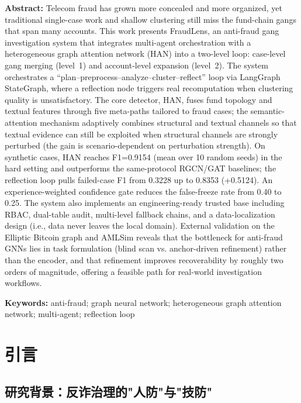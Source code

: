 \documentclass[12pt,a4paper]{ctexart}
\begin{document}
\noindent\textbf{Abstract:} Telecom fraud has grown more concealed and more organized, yet traditional single-case work and shallow clustering still miss the fund-chain gangs that span many accounts. This work presents FraudLens, an anti-fraud gang investigation system that integrates multi-agent orchestration with a heterogeneous graph attention network (HAN) into a two-level loop: case-level gang merging (level~1) and account-level expansion (level~2). The system orchestrates a ``plan--preprocess--analyze--cluster--reflect'' loop via LangGraph StateGraph, where a reflection node triggers real recomputation when clustering quality is unsatisfactory. The core detector, HAN, fuses fund topology and textual features through five meta-paths tailored to fraud cases; the semantic-attention mechanism adaptively combines structural and textual channels so that textual evidence can still be exploited when structural channels are strongly perturbed (the gain is scenario-dependent on perturbation strength). On synthetic cases, HAN reaches F1=0.9154 (mean over 10 random seeds) in the hard setting and outperforms the same-protocol RGCN/GAT baselines; the reflection loop pulls failed-case F1 from 0.3228 up to 0.8353 (+0.5124). An experience-weighted confidence gate reduces the false-freeze rate from 0.40 to 0.25. The system also implements an engineering-ready trusted base including RBAC, dual-table audit, multi-level fallback chains, and a data-localization design (i.e., data never leaves the local domain). External validation on the Elliptic Bitcoin graph and AMLSim reveals that the bottleneck for anti-fraud GNNs lies in task formulation (blind scan vs. anchor-driven refinement) rather than the encoder, and that refinement improves recoverability by roughly two orders of magnitude, offering a feasible path for real-world investigation workflows.

\noindent\textbf{Keywords:} anti-fraud; graph neural network; heterogeneous graph attention network; multi-agent; reflection loop

\section{引言}

\subsection{研究背景：反诈治理的"人防"与"技防"}
\end{document}
